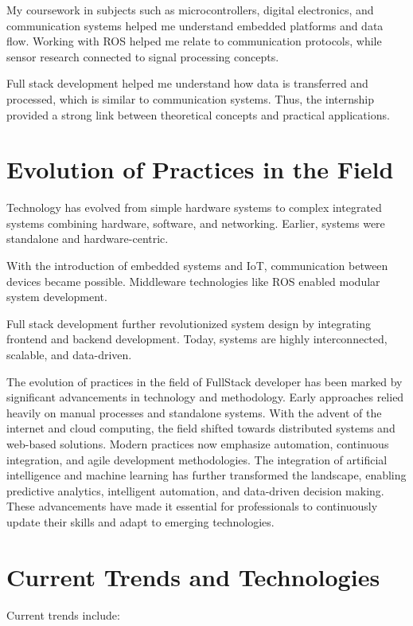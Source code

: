 \documentclass[12pt,a4paper]{report}
\begin{document}
My coursework in subjects such as microcontrollers, digital electronics, and communication systems helped me understand embedded platforms and data flow. Working with ROS helped me relate to communication protocols, while sensor research connected to signal processing concepts.


Full stack development helped me understand how data is transferred and processed, which is similar to communication systems. Thus, the internship provided a strong link between theoretical concepts and practical applications.


\section{Evolution of Practices in the Field}

Technology has evolved from simple hardware systems to complex integrated systems combining hardware, software, and networking. Earlier, systems were standalone and hardware-centric.


With the introduction of embedded systems and IoT, communication between devices became possible. Middleware technologies like ROS enabled modular system development.


Full stack development further revolutionized system design by integrating frontend and backend development. Today, systems are highly interconnected, scalable, and data-driven.


The evolution of practices in the field of FullStack developer has been marked by significant advancements in technology and methodology. Early approaches relied heavily on manual processes and standalone systems. With the advent of the internet and cloud computing, the field shifted towards distributed systems and web-based solutions. Modern practices now emphasize automation, continuous integration, and agile development methodologies. The integration of artificial intelligence and machine learning has further transformed the landscape, enabling predictive analytics, intelligent automation, and data-driven decision making. These advancements have made it essential for professionals to continuously update their skills and adapt to emerging technologies.


\section{Current Trends and Technologies}

Current trends include:
\end{document}
